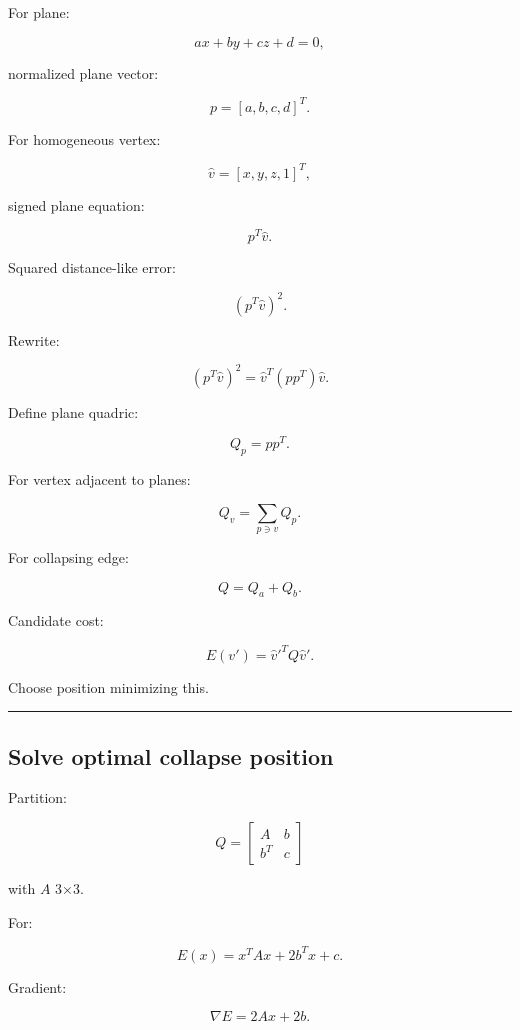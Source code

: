 \hypertarget{04-visual-computing-ii-ch041-quadric-error-metrics}{}

For plane:

\[
ax+by+cz+d=0,
\]

normalized plane vector:

\[
p=
[a,b,c,d]^T.
\]

For homogeneous vertex:

\[
\hat v=
[x,y,z,1]^T,
\]

signed plane equation:

\[
p^T\hat v.
\]

Squared distance-like error:

\[
(p^T\hat v)^2.
\]

Rewrite:

\[
\boxed{
(p^T\hat v)^2
=
\hat v^T
(pp^T)
\hat v.
}
\]

Define plane quadric:

\[
Q_p=pp^T.
\]

For vertex adjacent to planes:

\[
\boxed{
Q_v=
\sum_{p\ni v}
Q_p.
}
\]

For collapsing edge:

\[
Q=
Q_a+Q_b.
\]

Candidate cost:

\[
\boxed{
E(v')
=
\hat v'^TQ\hat v'.
}
\]

Choose position minimizing this.

\begin{center}\rule{0.5\linewidth}{0.5pt}\end{center}

\subsection{Solve optimal collapse position}\label{04-visual-computing-ii-ch041-solve-optimal-collapse-position}

\hypertarget{04-visual-computing-ii-ch041-solve-optimal-collapse-position}{}

Partition:

\[
Q=
\begin{bmatrix}
A&b\\
b^T&c
\end{bmatrix}
\]

with \(A\) 3×3.

For:

\[
E(x)=x^TAx+2b^Tx+c.
\]

Gradient:

\[
\nabla E=
2Ax+2b.
\]

